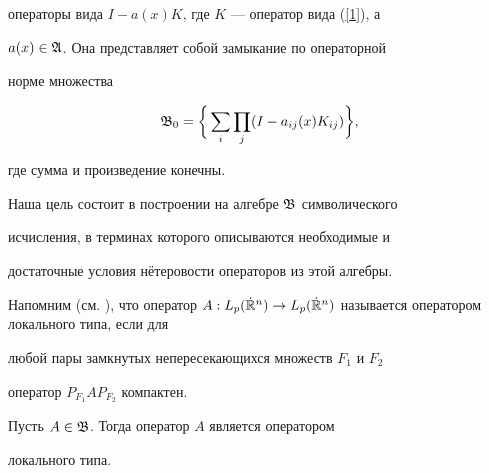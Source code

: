 операторы вида $I-a(x)K$, где $K$ --- оператор вида (\ref{1}), а


$a(x)\in\frak A$. Она представляет собой замыкание по операторной


норме множества


$$


\frak B_0=\bigg\{\sum_i\prod_j(I-a_{ij}(x)K_{ij})\bigg\},


$$


где сумма и произведение конечны.





Наша цель состоит в построении на алгебре $\frak B$ символического


исчисления, в терминах которого описываются необходимые и


достаточные условия н\"етеровости операторов из этой алгебры.





Напомним (см. \cite{b4}), что оператор $A:L_p(\Dot{\Bbb R}^n)\to


L_p(\Dot{\Bbb R}^n)$ называется оператором локального типа, если для


любой пары замкнутых непересекающихся множеств $F_1$ и $F_2$


оператор $P_{F_1}AP_{F_2}$ компактен.





\begin{lem}


Пусть $A\in\frak B$. Тогда оператор $A$ является оператором


локального типа.


\end{lem}





